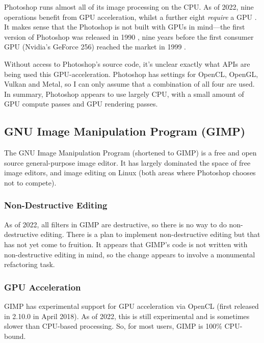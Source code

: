\documentclass[12pt]{article}
\begin{document}
Photoshop runs almost all of its image processing on the CPU.  As of 2022, nine operations benefit
from GPU acceleration, whilst a further eight \emph{require} a GPU \cite{photoshop-gpu}.  It makes
sense that the Photoshop is not built with GPUs in mind---the first version of Photoshop was
released in 1990 \cite{photoshop-wiki}, nine years before the first consumer GPU (Nvidia's GeForce
256) reached the market in 1999 \cite{first-gpu}.

Without access to Photoshop's source code, it's unclear exactly what APIs are being used this
GPU-acceleration.  Photoshop has settings for OpenCL, OpenGL, Vulkan and Metal, so I can only assume
that a combination of all four are used.  In summary, Photoshop appears to use largely CPU, with a
small amount of GPU compute passes and GPU rendering passes.

\subsection{GNU Image Manipulation Program (GIMP)}

The GNU Image Manipulation Program \cite{gimp} (shortened to GIMP) is a free and open
source general-purpose image editor.  It has largely dominated the space of free image editors, and
image editing on Linux (both areas where Photoshop chooses not to compete).

\subsubsection{Non-Destructive Editing}

As of 2022, all filters in GIMP are destructive, so there is no way to do non-destructive editing.
There is a plan to implement non-destructive editing \cite{gimp-faq} but that has not yet come to
fruition.  It appears that GIMP's code is not written with non-destructive editing in mind, so the
change appears to involve a monumental refactoring task.

\subsubsection{GPU Acceleration}

GIMP has experimental support for GPU acceleration via OpenCL (first released in 2.10.0
\cite{gimp-2.10} in April 2018).  As of 2022, this is still experimental and is sometimes slower
than CPU-based processing.  So, for most users, GIMP is 100\% CPU-bound.
\end{document}

